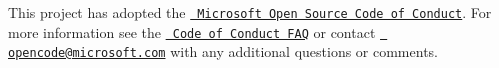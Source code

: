 This project has adopted the \href{https://opensource.microsoft.com/codeofconduct/}{\texttt{ Microsoft Open Source Code of Conduct}}. For more information see the \href{https://opensource.microsoft.com/codeofconduct/faq/}{\texttt{ Code of Conduct FAQ}} or contact \href{mailto:opencode@microsoft.com}{\texttt{ opencode@microsoft.\+com}} with any additional questions or comments. 